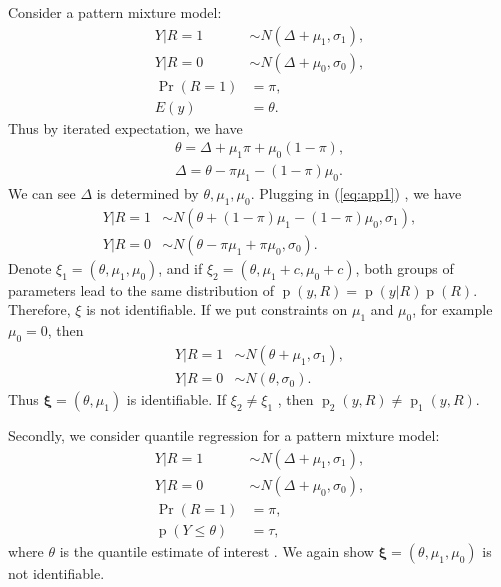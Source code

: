 \documentclass[12pt]{article}
\DeclareMathOperator{\pr}{p}
\DeclareMathOperator{\prob}{Pr}
\begin{document}
Consider a pattern mixture model:
\begin{align}
  Y | R = 1 & \sim N(\Delta + \mu_1 , \sigma_1), \label{eq:app1} \\
  Y | R = 0 & \sim N(\Delta + \mu_0, \sigma_0), \nonumber\\
  \prob (R = 1) & = \pi, \nonumber\\
  E (y ) & = \theta. \nonumber
\end{align}
Thus by iterated expectation, we have
\begin{align*}
  \theta = \Delta + \mu_1\pi + \mu_0(1-\pi) , \\
  \Delta = \theta - \pi \mu_1 - (1 - \pi)\mu_0.
\end{align*}
We can see $\Delta$ is determined by $\theta, \mu_1, \mu_0$. Plugging
in (\ref{eq:app1}) , we have
\begin{align*}
  Y| R = 1 & \sim N(\theta + (1 - \pi)\mu_1 - (1 - \pi)\mu_0, \sigma_1), \\
  Y| R = 0 & \sim N(\theta - \pi \mu_1 + \pi \mu_0, \sigma_0).
\end{align*}
Denote $\xi_1 = (\theta , \mu_1, \mu_0)$, and if $\xi_2 = (\theta,
\mu_1+ c, \mu_0+c)$, both groups of parameters lead to the same
distribution of $\pr(y, R) = \pr(y|R)\pr(R)$. Therefore, $\xi$ is not
identifiable.  If we put constraints on $\mu_1$ and $\mu_0$, for
example $\mu_0 = 0$, then
\begin{align*}
  Y | R = 1 & \sim N(\theta + \mu_1 , \sigma_1), \\
  Y | R = 0 & \sim N(\theta , \sigma_0).
\end{align*}
Thus $\bm \xi = (\theta, \mu_1)$ is identifiable. If $\xi_2 \neq
\xi_1$ , then $\pr_2(y, R) \neq \pr_1(y, R)$.

Secondly, we consider quantile regression for a pattern mixture model:
\begin{align*}
  Y | R = 1 & \sim N(\Delta + \mu_1 , \sigma_1) ,\\
  Y | R = 0 & \sim N(\Delta + \mu_0, \sigma_0) ,\\
  \prob (R = 1) & = \pi ,\\
  \pr (Y \leq \theta ) & = \tau,
\end{align*}
where $\theta$ is the quantile estimate of interest . We again show
$\bm \xi = (\theta, \mu_1, \mu_0) $ is not identifiable.
\end{document}
